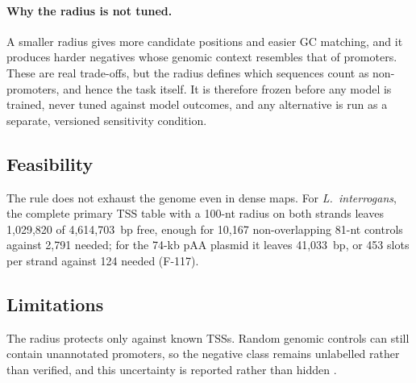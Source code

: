\paragraph{Why the radius is not tuned.}
A smaller radius gives more candidate positions and easier GC matching, and it
produces harder negatives whose genomic context resembles that of promoters.
These are real trade-offs, but the radius defines which sequences count as
non-promoters, and hence the task itself. It is therefore frozen before any
model is trained, never tuned against model outcomes, and any alternative is
run as a separate, versioned sensitivity condition.

\subsection{Feasibility}

The rule does not exhaust the genome even in dense maps. For
\textit{L.~interrogans}, the complete primary TSS table with a 100-nt radius on
both strands leaves 1,029,820 of 4,614,703~bp free, enough for 10,167
non-overlapping 81-nt controls against 2,791 needed; for the 74-kb pAA plasmid
it leaves 41,033~bp, or 453 slots per strand against 124 needed (F-117).

\subsection{Limitations}

The radius protects only against known TSSs. Random genomic controls can still
contain unannotated promoters, so the negative class remains unlabelled rather
than verified, and this uncertainty is reported rather than hidden
\citep{elkan2008pu}.
